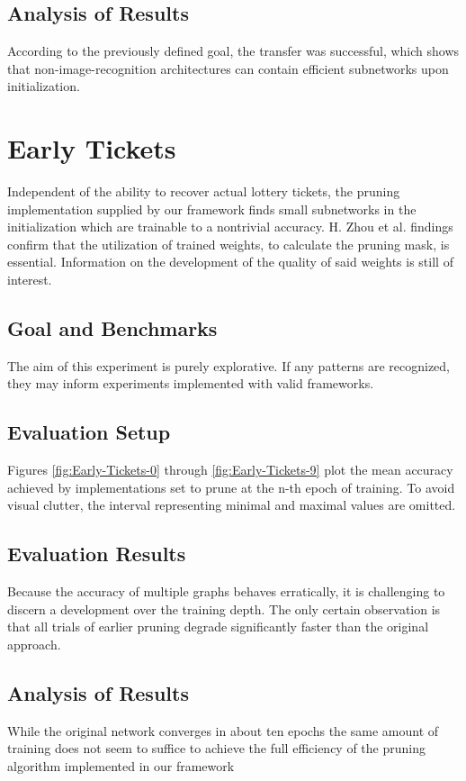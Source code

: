 \subsection*{Analysis of Results}
According to the previously defined goal, the transfer was successful, which shows that non-image-recognition architectures can contain efficient subnetworks upon initialization.

\newpage

\section{Early Tickets}
Independent of the ability to recover actual lottery tickets, the pruning implementation supplied by our framework finds small subnetworks in the initialization which are trainable to a nontrivial accuracy. H. Zhou et al. findings confirm that the utilization of trained weights, to calculate the pruning mask, is essential.\cite{Deconstructing_LTH} Information on the development of the quality of said weights is still of interest. 
\subsection*{Goal and Benchmarks}
The aim of this experiment is purely explorative. If any patterns are recognized, they may inform experiments implemented with valid frameworks.
\subsection*{Evaluation Setup}
Figures \ref{fig:Early-Tickets-0} through \ref{fig:Early-Tickets-9} plot the mean accuracy achieved by implementations set to prune at the n-th epoch of training. To avoid visual clutter, the interval representing minimal and maximal values are omitted. 
\subsection*{Evaluation Results}
Because the accuracy of multiple graphs behaves erratically, it is challenging to discern a development over the training depth. The only certain observation is that all trials of earlier pruning degrade significantly faster than the original approach.
\subsection*{Analysis of Results}
While the original network converges in about ten epochs the same amount of training does not seem to suffice to achieve the full efficiency of the pruning algorithm implemented in our framework

